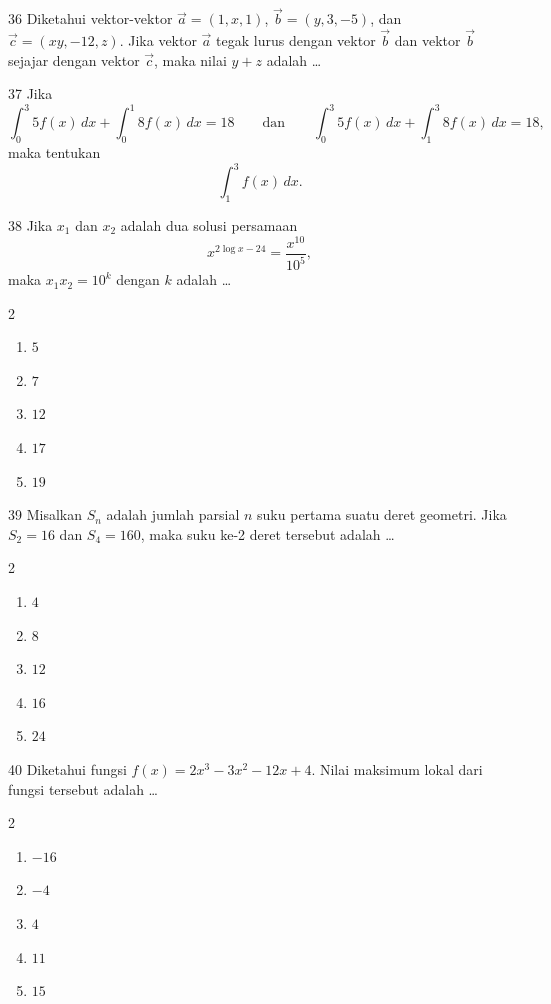 \documentclass[11pt]{article}
\newenvironment{pilB}{%
  \par\smallskip\begin{multicols}{2}
  \begin{enumerate}[label=(\Alph*),leftmargin=*,itemsep=1pt,topsep=3pt]}%
  {\end{enumerate}\end{multicols}}
\begin{document}
\begin{soal}{36}
Diketahui vektor-vektor $\vec{a}=(1,x,1)$, $\vec{b}=(y,3,-5)$,
dan $\vec{c}=(xy,-12,z)$. Jika vektor $\vec{a}$ tegak lurus
dengan vektor $\vec{b}$ dan vektor $\vec{b}$ sejajar dengan
vektor $\vec{c}$, maka nilai $y+z$ adalah \ldots
\end{soal}

\begin{soal}{37}
Jika
\[
  \int_0^3 5f(x)\,dx+\int_0^1 8f(x)\,dx=18
  \qquad\text{dan}\qquad
  \int_0^3 5f(x)\,dx+\int_1^3 8f(x)\,dx=18,
\]
maka tentukan
\[
  \int_1^3 f(x)\,dx.
\]
\end{soal}

\begin{soal}{38}
Jika $x_1$ dan $x_2$ adalah dua solusi persamaan
\[
  x^{2\log x-24}=\frac{x^{10}}{10^5},
\]
maka $x_1 x_2=10^k$ dengan $k$ adalah \ldots
\begin{pilB}
  \item $5$ \item $7$ \item $12$ \item $17$ \item $19$
\end{pilB}
\end{soal}

\begin{soal}{39}
Misalkan $S_n$ adalah jumlah parsial $n$ suku pertama suatu deret
geometri. Jika $S_2=16$ dan $S_4=160$, maka suku ke-2 deret
tersebut adalah \ldots
\begin{pilB}
  \item $4$ \item $8$ \item $12$ \item $16$ \item $24$
\end{pilB}
\end{soal}


\begin{soal}{40}
Diketahui fungsi $f(x)=2x^3-3x^2-12x+4$. Nilai maksimum lokal
dari fungsi tersebut adalah \ldots
\begin{pilB}
  \item $-16$ \item $-4$ \item $4$ \item $11$ \item $15$
\end{pilB}
\end{soal}
\end{document}
